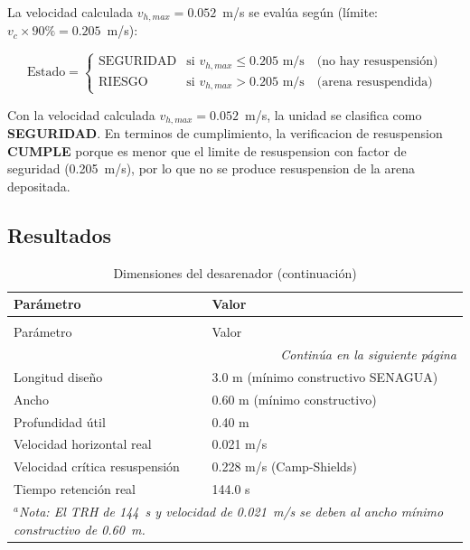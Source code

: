 La velocidad calculada $v_{h,max} = 0.052$~m/s se eval\'ua seg\'un (l\'imite: $v_c \times 90\% = 0.205$~m/s):

\begin{equation}
\text{Estado} = \begin{cases}
    \text{SEGURIDAD} & \text{si } v_{h,max} \leq 0.205 \text{ m/s} \quad \text{(no hay resuspensi\'on)} \\
    \text{RIESGO} & \text{si } v_{h,max} > 0.205 \text{ m/s} \quad \text{(arena resuspendida)}
\end{cases}
\end{equation}

Con la velocidad calculada $v_{h,max} = 0.052$~m/s, la unidad se clasifica como \textbf{SEGURIDAD}. En terminos de cumplimiento, la verificacion de resuspension \textbf{CUMPLE} porque es menor que el limite de resuspension con factor de seguridad (0.205~m/s), por lo que no se produce resuspension de la arena depositada.

\subsection{Resultados}

\begingroup
\small
\begin{longtable}{l p{9cm}}
\caption{Dimensiones del desarenador}\\
\toprule
Par\'ametro & Valor \\
\midrule
\endfirsthead
\caption[]{Dimensiones del desarenador (continuación)}\\
\toprule
Par\'ametro & Valor \\
\midrule
\endhead
\midrule
\multicolumn{2}{r}{\textit{Continúa en la siguiente página}} \\
\endfoot
\bottomrule
\endlastfoot
Longitud dise\~no & 3.0 m (m\'inimo constructivo SENAGUA) \\
Ancho & 0.60 m (m\'inimo constructivo) \\
Profundidad \'util & 0.40 m \\
Velocidad horizontal real & 0.021 m/s \\
Velocidad cr\'itica resuspensi\'on & 0.228 m/s (Camp-Shields) \\
Tiempo retenci\'on real & 144.0 s \\
\multicolumn{2}{p{\textwidth}}{\small\textit{$^a$Nota: El TRH de 144~s y velocidad de 0.021~m/s se deben al ancho m\'inimo constructivo de 0.60~m. }} \\
\end{longtable}
\endgroup

